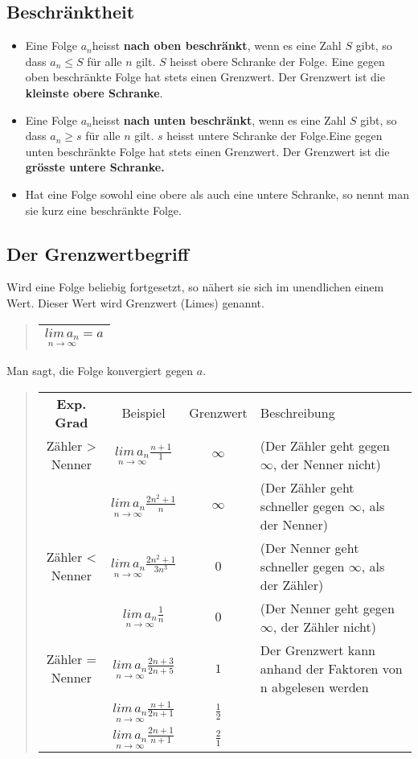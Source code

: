 \subsection*{Beschränktheit}
\begin{itemize}
\item Eine Folge $a_{n}$heisst \textbf{nach oben beschränkt}, wenn es eine
Zahl $S$ gibt, so dass $a_{n}\leq S$ für alle $n$ gilt. $S$ heisst
obere Schranke der Folge. Eine gegen oben beschränkte Folge hat stets
einen Grenzwert. Der Grenzwert ist die \textbf{kleinste obere Schranke}.
\item Eine Folge $a_{n}$heisst\textbf{ nach} \textbf{unten beschränkt},
wenn es eine Zahl $S$ gibt, so dass $a_{n}\geq s$ für alle $n$
gilt. $s$ heisst untere Schranke der Folge.Eine gegen unten beschränkte
Folge hat stets einen Grenzwert. Der Grenzwert ist die \textbf{grösste
untere Schranke.}
\item Hat eine Folge sowohl eine obere als auch eine untere Schranke, so
nennt man sie kurz eine beschränkte Folge.
\end{itemize}

\subsection*{Der Grenzwertbegriff}

Wird eine Folge beliebig fortgesetzt, so nähert sie sich im unendlichen
einem Wert. Dieser Wert wird Grenzwert (Limes) genannt.
\begin{verse}
\begin{tabular}{|c|}
\hline 
$\underset{n\rightarrow\infty}{lim\, a_{n}}=a$\tabularnewline
\hline 
\end{tabular}
\end{verse}
Man sagt, die Folge konvergiert gegen $a$.
\begin{verse}
\begin{tabular}{|c|c|c|l}
\cline{2-3} 
\multicolumn{1}{c|}{\textbf{Exp. Grad}} & Beispiel & Grenzwert & Beschreibung\tabularnewline
\cline{1-3} 
Zähler > Nenner & $\underset{n\rightarrow\infty}{lim\, a_{n}}\frac{n+1}{1}$ & $\infty$ & (Der Zähler geht gegen $\infty$, der Nenner nicht)\tabularnewline
\cline{1-3} 
 & $\underset{n\rightarrow\infty}{lim\, a_{n}}\frac{2n^{2}+1}{n}$ & $\infty$ & (Der Zähler geht schneller gegen $\infty$, als der Nenner)\tabularnewline
\cline{1-3} 
Zähler < Nenner & $\underset{n\rightarrow\infty}{lim\, a_{n}}\frac{2n^{2}+1}{3n^{3}}$ & $0$ & (Der Nenner geht schneller gegen $\infty$, als der Zähler)\tabularnewline
\cline{1-3} 
 & $\underset{n\rightarrow\infty}{lim\, a_{n}}\frac{1}{n}$ & $0$ & (Der Nenner geht gegen $\infty$, der Zähler nicht)\tabularnewline
\cline{1-3} 
Zähler = Nenner & $\underset{n\rightarrow\infty}{lim\, a_{n}}\frac{2n+3}{2n+5}$ & $1$ & Der Grenzwert kann anhand der Faktoren von n abgelesen werden\tabularnewline
\cline{1-3} 
 & $\underset{n\rightarrow\infty}{lim\, a_{n}}\frac{n+1}{2n+1}$ & $\frac{1}{2}$ & \tabularnewline
\cline{1-3} 
 & $\underset{n\rightarrow\infty}{lim\, a_{n}}\frac{2n+1}{n+1}$ & $\frac{2}{1}$ & \tabularnewline
\cline{1-3} 
\end{tabular}
\end{verse}

